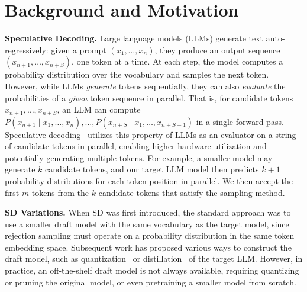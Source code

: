 \section{Background and Motivation}
\textbf{Speculative Decoding.}
Large language models (LLMs) generate text auto-regressively: given a prompt $(x_1, \ldots, x_n)$, they produce an output sequence $(x_{n+1}, \ldots, x_{n+S})$, 
one token at a time. At each step, the model computes a probability distribution over the vocabulary and samples the next token. 
However, while LLMs \emph{generate} tokens sequentially, they can also \emph{evaluate} the probabilities of a \emph{given} token sequence in parallel. That is, for candidate tokens $x_{n+1}, \ldots, x_{n+S}$, an LLM can compute $P(x_{n+1} \mid x_1, \ldots, x_n), \ldots, P(x_{n+S} \mid x_1, \ldots, x_{n+S-1})$ in a single forward pass.
Speculative decoding~\cite{leviathan2023fast, chen2023accelerating} utilizes this property of LLMs as an evaluator on a string of candidate tokens in parallel, enabling higher hardware utilization and potentially generating multiple tokens.
For example, a smaller model may generate $k$ candidate tokens, and our target LLM model then predicts $k+1$ probability distributions for each token position in parallel. We then accept the first $m$ tokens from the $k$ candidate tokens that satisfy the sampling method. 

\textbf{SD Variations.}
When SD was first introduced, the standard approach was to use a smaller draft model with the same vocabulary as the target model, since rejection sampling must operate on a probability distribution in the same token embedding space.
Subsequent work has proposed various ways to construct the draft model, such as quantization~\cite{lin2023awq, frantar2023gptq, kim2024squeezellm} or distillation~\cite{zhou2023distillspec} of the target LLM.
However, in practice, an off-the-shelf draft model is not always available, requiring quantizing or pruning the original model, or even pretraining a smaller model from scratch.

